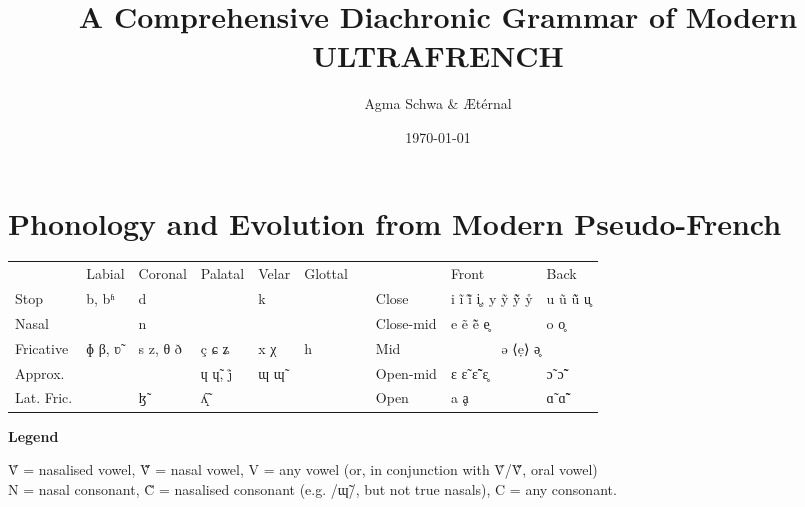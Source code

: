 \documentclass[a4paper, 12pt, oneside, final]{article}
\title{A Comprehensive Diachronic Grammar of Modern ULTRAFRENCH}
\author{Agma Schwa \& Ætérnal}
\date{\today}
\def\parheading#1{\noindent\textbf{#1}}
\let\Sub\textsubscript
\begin{document}
\maketitle
\thispagestyle{empty}
\clearpage
\setcounter{page}{1}

\section{Phonology and Evolution from Modern Pseudo-French}\label{sec:phonology}{\def\arraystretch{1.25}\setlength{\tabcolsep}{.4em}
\noindent\begin{tabular}{@{}|l|l|l|l|l|l|l@{\quad}|l|l|l|}                                                   \cline{1-6} \cline{8-10}
               & Labial & Coronal  & Palatal  & Velar & Glottal &&           & Front        & Back        \\ \cline{1-6} \cline{8-10}
    Stop       & b, bʱ  & d        &          & k     &         && Close     & i ĩ ĩ̃ i̥, y ỹ ỹ̃ ẙ & u ũ ũ̃ u̥ \\ \cline{1-6} \cline{8-10}
    Nasal      &        & n        &          &       &         && Close-mid & e ẽ ẽ̃ e̥      & o o̥         \\ \cline{1-6} \cline{8-10}
    Fricative  & ɸ β, ʋ̃ & s z, θ ð & ç ɕ ʑ    & x χ   & h       && Mid       & \multicolumn{2}{c|}{ə ⟨ẹ⟩ ə̥}   \\ \cline{1-6} \cline{8-10}
    Approx.    &        &          & ɥ ɥ̃, j̊   & ɰ ɰ̃   &         && Open-mid  & ɛ ɛ̃ ɛ̃̃ ɛ̥      & ɔ̃ ɔ̃̃         \\ \cline{1-6} \cline{8-10}
    Lat. Fric. &        & ɮ̃        & ʎ̝̃        &       &         && Open      & a ḁ          & ɑ̃ ɑ̃̃         \\ \cline{1-6} \cline{8-10}
\end{tabular}}\bigskip

\parheading{Legend}\par\noindent
Ṽ = nasalised vowel, Ṽ̃ = nasal vowel, V = any vowel (or, in conjunction with Ṽ/Ṽ̃, oral vowel)\\
N = nasal consonant, C̃ = nasalised consonant (e.g. /ɰ̃/, but not true nasals), C = any consonant.\medskip
\def\scalpha{\kern-2pt\raisebox{2pt}{\Sub α}}

\end{document}

